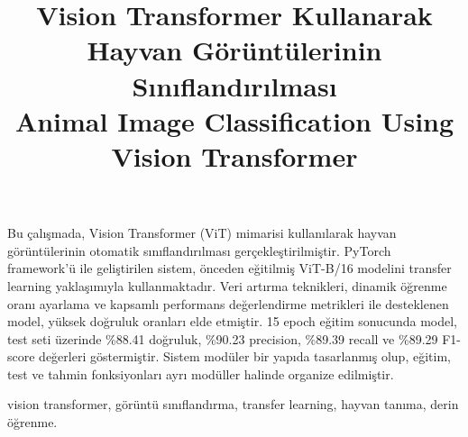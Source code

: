\documentclass[conference, a4paper]{IEEEtran}
\begin{document}
\title{Vision Transformer Kullanarak Hayvan Görüntülerinin Sınıflandırılması\\
	Animal Image Classification Using Vision Transformer}

\author{
	\and
	\and
}

	\maketitle
	
	\begin{ozet}
		Bu çalışmada, Vision Transformer (ViT) mimarisi kullanılarak hayvan görüntülerinin otomatik sınıflandırılması gerçekleştirilmiştir. PyTorch framework'ü ile geliştirilen sistem, önceden eğitilmiş ViT-B/16 modelini transfer learning yaklaşımıyla kullanmaktadır. Veri artırma teknikleri, dinamik öğrenme oranı ayarlama ve kapsamlı performans değerlendirme metrikleri ile desteklenen model, yüksek doğruluk oranları elde etmiştir. 15 epoch eğitim sonucunda model, test seti üzerinde \%88.41 doğruluk, \%90.23 precision, \%89.39 recall ve \%89.29 F1-score değerleri göstermiştir. Sistem modüler bir yapıda tasarlanmış olup, eğitim, test ve tahmin fonksiyonları ayrı modüller halinde organize edilmiştir.
	\end{ozet}
	\begin{IEEEanahtar}
		vision transformer, görüntü sınıflandırma, transfer learning, hayvan tanıma, derin öğrenme.
	\end{IEEEanahtar}
	
\end{document}
